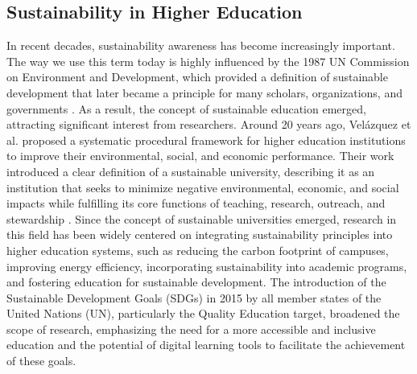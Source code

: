 \subsection{Sustainability in Higher Education}
In recent decades, sustainability awareness has become increasingly important. The way we use this term today is highly influenced by the 1987 UN Commission on Environment and Development, which provided a definition of sustainable development that later became a principle for many scholars, organizations, and governments \cite{correia_sustainability_2019}. 
As a result, the concept of sustainable education emerged, attracting significant interest from researchers. Around 20 years ago, Velázquez et al. proposed a systematic procedural framework for higher education institutions to improve their environmental, social, and economic performance. Their work introduced a clear definition of a sustainable university, describing it as an institution that seeks to minimize negative environmental, economic, and social impacts while fulfilling its core functions of teaching, research, outreach, and stewardship \cite{velazquez_sustainable_2006}. 
Since the concept of sustainable universities emerged, research in this field has been widely centered on integrating sustainability principles into higher education systems, such as reducing the carbon footprint of campuses, improving energy efficiency, incorporating sustainability into academic programs, and fostering education for sustainable development. The introduction of the Sustainable Development Goals (SDGs) in 2015 by all member states of the United Nations (UN), particularly the Quality Education target, broadened the scope of research, emphasizing the need for a more accessible and inclusive education and the potential of digital learning tools to facilitate the achievement of these goals.

